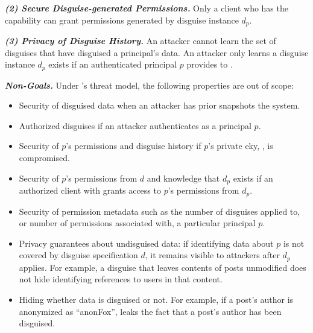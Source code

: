 \vspace{6pt}\noindent\textbf{\emph{(2) Secure Disguise-generated Permissions.}}
%
%
Only a client who has the capability  can grant \sys permissions generated
by disguise instance $d_p$.
%
%

\vspace{6pt}\noindent\textbf{\emph{(3) Privacy of Disguise History.}}
%
An attacker cannot learn the set of disguises that have disguised a principal's data.
%
An attacker only learns a disguise instance $d_p$ exists if an authenticated principal $p$ provides
 to \sys.

\vspace{6pt}\noindent\textbf{\emph{Non-Goals.}}
%
Under \sys's threat model, the following properties are out of scope:
%
\begin{itemize}
    \item Security of disguised data when an attacker has prior snapshots the system.
    \item Authorized disguises if an attacker authenticates as a principal $p$. 
    \item Security of $p$'s permissions and disguise history if $p$'s private eky, , is compromised.
    \item Security of $p$'s permissions from $d$ and knowledge that $d_p$ exists if an
	authorized client with  grants \sys access to $p$'s permissions from $d_p$. 
    \item Security of permission metadata such as the number of disguises applied to, or number of
	permissions associated with, a particular principal $p$.
    \item Privacy guarantees about undisguised data: if identifying data about $p$ is not covered by
        disguise specification $d$, it remains visible to attackers after $d_p$ applies.
        For example, a disguise that leaves contents of posts unmodified does not hide identifying references
	to users in that content.
    \item Hiding whether data is disguised or not. For example, if a post's author is anonymized as ``anonFox'',
        \sys leaks the fact that a post's author has been disguised.
\end{itemize}

